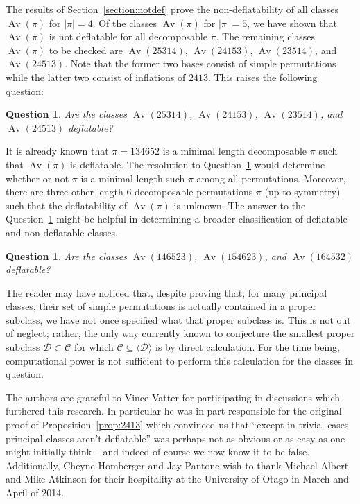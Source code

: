 \documentclass[10pt]{article}
\theoremstyle{plain}
\newtheorem{question}[theorem]{Question}
\newcommand{\Av}{\operatorname{Av}}
\newcommand{\C}{\mathcal{C}}
\newcommand{\D}{\mathcal{D}}
\begin{document}
The results of Section~\ref{section:notdef} prove the non-deflatability of all classes $\Av(\pi)$ for $|\pi|=4$.
Of the classes $\Av(\pi)$ for $|\pi| = 5$, we have shown that $\Av(\pi)$ is not deflatable for all decomposable $\pi$. The remaining classes $\Av(\pi)$ to be checked are $\Av(25314)$, $\Av(24153)$, $\Av(23514)$, and $\Av(24513)$. Note that the former two bases consist of simple permutations while the latter two consist of inflations of $2413$.  This raises the following question: 

\begin{question}
	\label{question:len-5-def}
	Are the classes $\Av(25314)$, $\Av(24153)$, $\Av(23514)$, and $\Av(24513)$ deflatable?
\end{question}

It is already known that $\pi = 134652$ is a minimal length decomposable $\pi$ such that $\Av(\pi)$ is deflatable. The resolution to Question~\ref{question:len-5-def} would determine whether or not $\pi$ is a minimal length such $\pi$ among all permutations. Moreover, there are three other length $6$ decomposable permutations $\pi$ (up to symmetry) such that the deflatability of $\Av(\pi)$ is unknown. The answer to the Question~\ref{question:len-6-def} might be helpful in determining a  broader classification of deflatable and non-deflatable classes.

\begin{question}
	\label{question:len-6-def}
	Are the classes $\Av(146523)$, $\Av(154623)$, and $\Av(164532)$ deflatable?
\end{question}

The reader may have noticed that, despite proving that, for  many principal classes, their set of simple permutations  is actually contained in a proper subclass, we have not once specified what that proper subclass is. This is not out of neglect; rather, the only way currently known to conjecture the smallest proper subclass $\D \subset \C$ for which $ \C  \subseteq \langle \D \rangle$ is by direct calculation. For the time being, computational power is not sufficient to perform this calculation for the classes in question.

\bigskip

 The authors are grateful to Vince Vatter for participating in discussions which furthered this research. In particular he was in part responsible for the original proof of Proposition~\ref{prop:2413} which convinced us that ``except in trivial cases principal classes aren't deflatable'' was perhaps not as obvious or as easy as one might initially think -- and indeed of course we now know it to be false. Additionally, Cheyne Homberger and Jay Pantone wish to thank Michael Albert and Mike Atkinson for their hospitality at the University of Otago in March and April of 2014.



\end{document}
